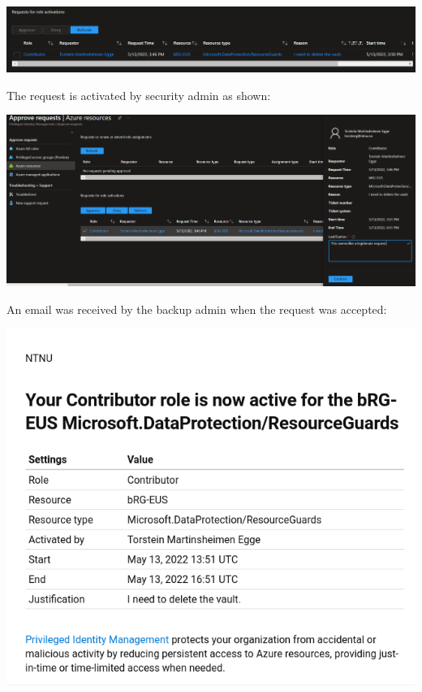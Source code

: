 \includegraphics[width=.9\linewidth]{figures/mua/Capture.PNG}

The request is activated by security admin as shown:

\includegraphics[width=.9\linewidth]{figures/mua/approve.PNG}


An email was received by the backup admin when the request was accepted:
\begin{center}
\includegraphics[width=.9\linewidth]{figures/mua/role_active_email.png}
\end{center}

